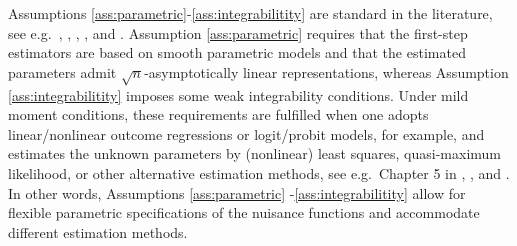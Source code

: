 \documentclass[11pt]{article}%
\theoremstyle{plain}
\numberwithin{sassumption}{section}
\numberwithin{equation}{section}
\begin{document}
Assumptions \ref{ass:parametric}-\ref{ass:integrabilitity} are standard in the
literature, see e.g.~\cite{Abadie2005}, \cite{Wooldridge2007a},
\cite{Bonhomme2011}, \cite{Graham2012}, and \cite{SantAnna2020}. Assumption
\ref{ass:parametric} requires that the first-step estimators are based on
smooth parametric models and that the estimated parameters admit $\sqrt{n}%
$-asymptotically linear representations, whereas Assumption
\ref{ass:integrabilitity} imposes some weak integrability conditions. Under
mild moment conditions, these requirements are fulfilled when one adopts
linear/nonlinear outcome regressions or logit/probit models, for example, and
estimates the unknown parameters by (nonlinear) least squares, quasi-maximum
likelihood, or other alternative estimation methods, see e.g.~Chapter 5 in
\cite{VanderVaart1998}, \cite{Wooldridge2007a}, \cite{Graham2012} and
\cite{SantAnna2020}. In other words, Assumptions \ref{ass:parametric}%
-\ref{ass:integrabilitity} allow for flexible parametric specifications of the
nuisance functions and accommodate different estimation methods.
\end{document}
